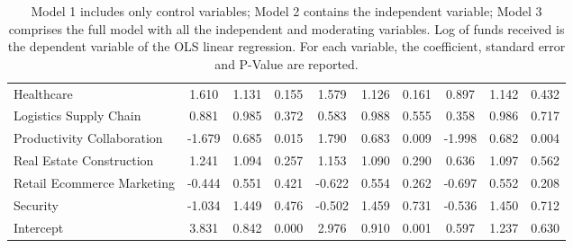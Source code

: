 \documentclass[12pt]{article}
\begin{document}
\begin{table}
\begin{tabular}{lccccccccc}
      Healthcare & 1.610 & 1.131 & 0.155 & 1.579 & 1.126 & 0.161 & 0.897 & 1.142 & 0.432 \\
      Logistics Supply Chain & 0.881 & 0.985 & 0.372 & 0.583 & 0.988 & 0.555 & 0.358 & 0.986 & 0.717 \\
      Productivity Collaboration & -1.679 & 0.685 & 0.015 & 1.790 & 0.683 & 0.009 & -1.998 & 0.682 & 0.004 \\
      Real Estate Construction & 1.241 & 1.094 & 0.257 & 1.153 & 1.090 & 0.290 & 0.636 & 1.097 & 0.562 \\
      Retail Ecommerce Marketing & -0.444 & 0.551 & 0.421 & -0.622 & 0.554 & 0.262 & -0.697 & 0.552 & 0.208 \\
      Security & -1.034 & 1.449 & 0.476 & -0.502 & 1.459 & 0.731 & -0.536 & 1.450 & 0.712 \\
      Intercept & 3.831 & 0.842 & 0.000 & 2.976 & 0.910 & 0.001 & 0.597 & 1.237 & 0.630 \\
  \end{tabular}
\caption{Model 1 includes only control variables; Model 2 contains the independent variable; Model 3 comprises the full model with all the independent and moderating variables. Log of funds received is the dependent variable of the OLS linear regression. For each variable, the coefficient, standard error and P-Value are reported.}
\label{table6}
\end{table}
\end{document}
